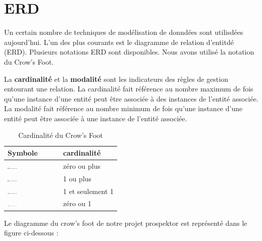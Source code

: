 \section{\gls{ERD}}
Un certain nombre de techniques de mod\'elisation de donnd\'ees sont utilisd\'ees aujourd'hui. L'un des plus courants est le diagramme de relation d'entitd\'e (\gls{ERD}). Plusieurs notations \gls{ERD} sont disponibles. Nous avons utilis\'e la notation du Crow's Foot.

La \textbf{cardinalit\'e} et la \textbf{modalit\'e} sont les indicateurs des r\`egles de gestion entourant une relation. La cardinalit\'e fait r\'ef\'erence au nombre maximum de fois qu'une instance d'une entit\'e peut \^etre associ\'ee \`a des instances de l'entit\'e associ\'ee. La modalit\'e fait r\'ef\'erence au nombre minimum de fois qu'une instance d'une entit\'e peut \^etre associ\'ee \`a une instance de l'entit\'e associ\'ee.

\begin{table}[H]
\begin{center}
\begin{tabular}{ |l|l| }
\hline Symbole & cardinalit\'e \\ \hline \hline
\includegraphics[width=0.2\textwidth]{Figures/0+.png}
& z\'ero ou plus \\ \hline
\includegraphics[width=0.2\textwidth]{Figures/1+.png}
& 1 ou plus \\ \hline
\includegraphics[width=0.2\textwidth]{Figures/11.png}
& 1 et seulement 1 \\ \hline
\includegraphics[width=0.2\textwidth]{Figures/01.png}
& z\'ero ou 1 \\
\hline
\end{tabular}
\caption{Cardinalit\'e du Crow's Foot}
\end{center}
\end{table}

Le diagramme du crow's foot de notre projet prospektor est repr\'esent\'e dans le figure ci-dessous :

